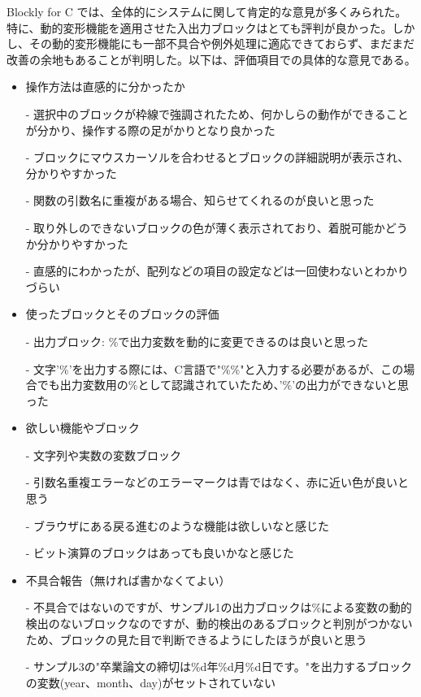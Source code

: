 \documentclass{eniepaper}
\begin{document}
Blockly for C では、全体的にシステムに関して肯定的な意見が多くみられた。特に、動的変形機能を適用させた入出力ブロックはとても評判が良かった。しかし、その動的変形機能にも一部不具合や例外処理に適応できておらず、まだまだ改善の余地もあることが判明した。以下は、評価項目での具体的な意見である。
   
\begin{itemize}
\item 操作方法は直感的に分かったか

    - 選択中のブロックが枠線で強調されたため、何かしらの動作ができることが分かり、操作する際の足がかりとなり良かった

    - ブロックにマウスカーソルを合わせるとブロックの詳細説明が表示され、分かりやすかった

    - 関数の引数名に重複がある場合、知らせてくれるのが良いと思った

    - 取り外しのできないブロックの色が薄く表示されており、着脱可能かどうか分かりやすかった
    
    - 直感的にわかったが、配列などの項目の設定などは一回使わないとわかりづらい

\item 使ったブロックとそのブロックの評価

 - 出力ブロック: \%で出力変数を動的に変更できるのは良いと思った

 - 文字'\%'を出力する際には、C言語で"\%\%"と入力する必要があるが、この場合でも出力変数用の\%として認識されていたため、'\%'の出力ができないと思った

\item 欲しい機能やブロック

    - 文字列や実数の変数ブロック

    - 引数名重複エラーなどのエラーマークは青ではなく、赤に近い色が良いと思う
    
    - ブラウザにある戻る進むのような機能は欲しいなと感じた
    
    - ビット演算のブロックはあっても良いかなと感じた

\item 不具合報告（無ければ書かなくてよい）

    - 不具合ではないのですが、サンプル1の出力ブロックは\%による変数の動的検出のないブロックなのですが、動的検出のあるブロックと判別がつかないため、ブロックの見た目で判断できるようにしたほうが良いと思う

    - サンプル3の"卒業論文の締切は\%d年\%d月\%d日です。"を出力するブロックの変数(year、month、day)がセットされていない
    
\end{itemize} 
\end{document}
